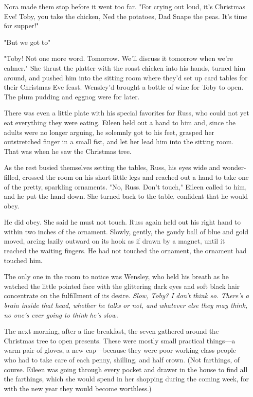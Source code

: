 Nora made them stop before it went too far. "For crying out loud, it's Christmas Eve! Toby, you take the chicken, Ned the potatoes, Dad Snape the peas. It's time for supper!"

"But we got to{\el}"

"Toby! Not one more word. Tomorrow. We'll discuss it tomorrow when we're calmer." She thrust the platter with the roast chicken into his hands, turned him around, and pushed him into the sitting room where they'd set up card tables for their Christmas Eve feast. Wensley'd brought a bottle of wine for Toby to open. The plum pudding and eggnog were for later.

There was even a little plate with his special favorites for Russ, who could not yet eat everything they were eating. Eileen held out a hand to him and, since the adults were no longer arguing, he solemnly got to his feet, grasped her outstretched finger in a small fist, and let her lead him into the sitting room. That was when he saw the Christmas tree.

As the rest busied themselves setting the tables, Russ, his eyes wide and wonder-filled, crossed the room on his short little legs and reached out a hand to take one of the pretty, sparkling ornaments. "No, Russ. Don't touch," Eileen called to him, and he put the hand down. She turned back to the table, confident that he would obey.

He did obey. She said he must not touch. Russ again held out his right hand to within two inches of the ornament. Slowly, gently, the gaudy ball of blue and gold moved, arcing lazily outward on its hook as if drawn by a magnet, until it reached the waiting fingers. He had not touched the ornament, the ornament had touched him.

The only one in the room to notice was Wensley, who held his breath as he watched the little pointed face with the glittering dark eyes and soft black hair concentrate on the fulfillment of its desire. \emph{Slow, Toby? I don't think so. There's a brain inside that head, whether he talks or not, and whatever else they may think, no one's ever going to think he's slow.}

The next morning, after a fine breakfast, the seven gathered around the Christmas tree to open presents. These were mostly small practical things—a warm pair of gloves, a new cap—because they were poor working-class people who had to take care of each penny, shilling, and half crown. (Not farthings, of course. Eileen was going through every pocket and drawer in the house to find all the farthings, which she would spend in her shopping during the coming week, for with the new year they would become worthless.)


